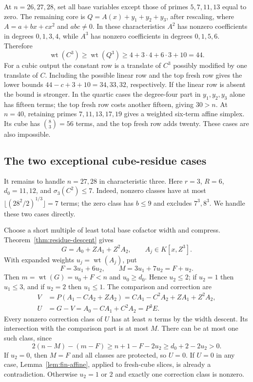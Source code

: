 \documentclass[11pt]{article}
\DeclareMathOperator{\wt}{wt}\DeclareMathOperator{\ord}{ord}
\numberwithin{equation}{section}
\theoremstyle{definition}\newtheorem{definition}[theorem]{Definition}
\theoremstyle{remark}\newtheorem{remark}[theorem]{Remark}
\begin{document}
At $n=26,27,28$, set all base variables except those of primes
$5,7,11,13$ equal to zero. The remaining core is
$Q=A(x)+y_1+y_2+y_3$, after rescaling, where $A=a+bx+cx^2$ and
$abc\ne0$. In these characteristics $A^2$ has nonzero coefficients
in degrees $0,1,3,4$, while $A^3$ has nonzero coefficients in degrees
$0,1,5,6$. Therefore
\begin{equation}\label{eq:fin-cubic-bound}
 \wt(C^3)\ge\wt(Q^3)\ge4+3\cdot4+6\cdot3+10=44.
\end{equation}
For a cubic output the constant row is a translate of $C^3$ possibly
modified by one translate of $C$. Including the possible linear row
and the top fresh row gives the lower bounds
$44-c+3+10=34,33,32$, respectively. If the linear row is absent the
bound is stronger. In the quartic cases the degree-four part in
$y_1,y_2,y_3$ alone has fifteen terms; the top fresh row costs another
fifteen, giving $30>n$.
At $n=40$, retaining primes $7,11,13,17,19$ gives a weighted six-term
affine simplex. Its cube has $\binom83=56$ terms, and the top fresh
row adds twenty. These cases are also impossible.

\subsection{The two exceptional cube-residue cases}

It remains to handle $n=27,28$ in characteristic three. Here
$r=3$, $R=6$, $d_0=11,12$, and $\sigma_3(C^2)\le7$.
Indeed, nonzero classes have at most $\lfloor(28^2/2)^{1/3}\rfloor=7$
terms; the zero class has $b\le9$ and excludes $7^3,8^3$.
We handle these two cases directly.

Choose a short multiple of least total base cofactor width and compress. Theorem~\ref{thm:residue-descent} gives
\[
 G=A_0+ZA_1+Z^2A_2,\qquad A_j\in K[x,Z^3].
\]
With expanded weights $u_j=\wt(A_j)$, put
\[
 F=3u_1+6u_2,\qquad M=3u_1+7u_2=F+u_2.
\]
Then $m=\wt(G)=u_0+F<n$ and $u_0\ge d_0$. Hence $u_2\le2$;
if $u_2=1$ then $u_1\le3$, and if $u_2=2$ then $u_1\le1$.
The comparison and correction are
\begin{align*}
 V&=P(A_1-CA_2+ZA_2)
     =CA_1-C^2A_2+ZA_1+Z^2A_2,\\
 U&=G-V=A_0-CA_1+C^2A_2=P^3E.
\end{align*}
Every nonzero correction class of $U$ has at least $n$ terms by the
width descent. Its intersection with the comparison part is at most
$M$. There can be at most one such class, since
\[
 2(n-M)-(m-F)\ge n+1-F-2u_2\ge d_0+2-2u_2>0.
\]
If $u_2=0$, then $M=F$ and all classes are protected, so $U=0$.
If $U=0$ in any case, Lemma~\ref{lem:fin-affine}, applied to fresh-cube
slices, is already a contradiction. Otherwise $u_2=1$ or $2$ and
exactly one correction class is nonzero.
\end{document}
